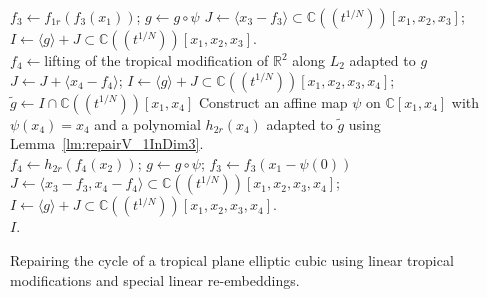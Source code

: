 \documentclass[11pt]{amsart}
\numberwithin{equation}{section}
\theoremstyle{plain}
\theoremstyle{definition}
\theoremstyle{remark}
\begin{document}
\begin{algorithm}[htb]
{{  $f_3\leftarrow f_{1r}(f_3(x_1))$; \hspace{1ex} $g\leftarrow g\circ \psi$\;}}
  $J \leftarrow \langle x_3-f_3\rangle \subset {{\mathbb{C}}(\!(t^{1/N})\!)}[x_1,x_2,x_3]$;\hspace{1ex} $I\leftarrow \langle g \rangle +J \subset {{\mathbb{C}}(\!(t^{1/N})\!)}[x_1,x_2,x_3]$.\\
{$f_4\leftarrow $lifting of the  tropical modification of ${\mathbb{R}}^2$ along $L_2$ adapted to $g$\;
$J\leftarrow J + \langle x_4-f_4\rangle $; $I\leftarrow \langle g \rangle +J \subset {{\mathbb{C}}(\!(t^{1/N})\!)}[x_1,x_2,x_3,x_4]$;
$\tilde{g}\leftarrow I \cap {{\mathbb{C}}(\!(t^{1/N})\!)}[x_1,x_4]$\; 
{Construct an affine map $\psi$ on ${\mathbb{C}}[x_1,x_4]$ with $\psi(x_4)=x_4$ and a polynomial $h_{2r}(x_4)$ adapted to $\tilde{g}$ using Lemma~\ref{lm:repairV_1InDim3}.\\
  $f_4\leftarrow h_{2r}(f_4(x_2))$; \hspace{1ex} $g\leftarrow g\circ \psi$;\hspace{1ex}
$f_3 \leftarrow f_3(x_1-\psi(0))$\;
$J \leftarrow \langle x_3-f_3, x_4-f_4\rangle \subset {{\mathbb{C}}(\!(t^{1/N})\!)}[x_1,x_2,x_3,x_4]$;\hspace{1ex} $I\leftarrow \langle g \rangle +J \subset {{\mathbb{C}}(\!(t^{1/N})\!)}[x_1,x_2,x_3,x_4]$.\\}
}\Return $I$.
  \caption{Repairing the cycle of a  tropical plane elliptic cubic using
   linear tropical modifications and special linear re-embeddings.}    \label{alg:repairElliptic}
\end{algorithm}
\end{document}
